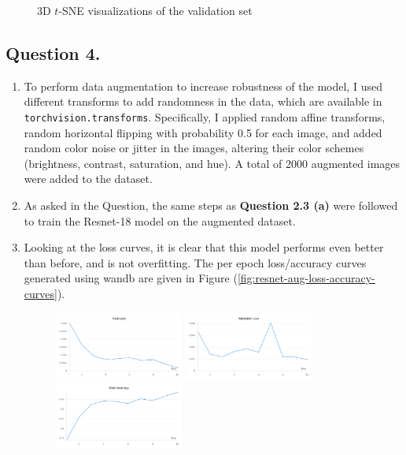 \documentclass[10pt]{article}
\begin{document}
\begin{enumerate}[label=(\alph*)]
\begin{figure}[h!]
            \caption{3D $t$-SNE visualizations of the validation set}
            \label{fig:resnet-tsne-3d}
        \end{figure}
    \end{enumerate}

    \subsection*{\textbf{Question 4.}}
    \begin{enumerate}[label=(\alph*)]
        \item To perform data augmentation to increase robustness of the model, I used different
        transforms to add randomness in the data, which are available in \texttt{torchvision.transforms}.
        Specifically, I applied random affine transforms, random horizontal flipping with probability
        0.5 for each image, and added random color noise or jitter in the images, altering their
        color schemes (brightness, contrast, saturation, and hue). A total of 2000 augmented images were
        added to the dataset.
        \item As asked in the Question, the same steps as \textbf{Question 2.3 (a)} were
        followed to train the Resnet-18 model on the augmented dataset.
        \item Looking at the loss curves, it is clear that this model performs even better
        than before, and is not overfitting. The per epoch loss/accuracy curves generated using wandb
        are given in Figure (\ref{fig:resnet-aug-loss-accuracy-curves}).
        \begin{figure}[h!]
            \centering
            \includegraphics[width=0.4\textwidth]{Assets/Classification/Resnet-Aug/01}
            \includegraphics[width=0.4\textwidth]{Assets/Classification/Resnet-Aug/02}
            \includegraphics[width=0.4\textwidth]{Assets/Classification/Resnet-Aug/03}

\end{figure}
\end{enumerate}
\end{document}
